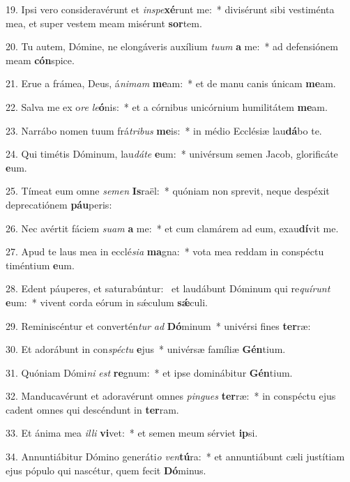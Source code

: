 19. Ipsi vero consideravérunt et \textit{in}\textit{spe}\textbf{xé}runt me:~*  divisérunt sibi vestiménta mea, et super vestem meam misérunt \textbf{sor}tem.\

20. Tu autem, Dómine, ne elongáveris auxílium \textit{tu}\textit{um} \textbf{a} me:~*  ad defensiónem meam \textbf{cón}spice.\

21. Erue a frámea, Deus, á\textit{ni}\textit{mam} \textbf{me}am:~*  et de manu canis únicam \textbf{me}am.\

22. Salva me ex o\textit{re} \textit{le}\textbf{ó}nis:~*  et a córnibus unicórnium humilitátem \textbf{me}am.\

23. Narrábo nomen tuum frá\textit{tri}\textit{bus} \textbf{me}is:~*  in médio Ecclésiæ lau\textbf{dá}bo te.\

24. Qui timétis Dóminum, lau\textit{dá}\textit{te} \textbf{e}um:~*  univérsum semen Jacob, glorificáte \textbf{e}um.\

25. Tímeat eum omne \textit{se}\textit{men} \textbf{Is}raël:~*  quóniam non sprevit, neque despéxit deprecatiónem \textbf{páu}peris:\

26. Nec avértit fáciem \textit{su}\textit{am} \textbf{a} me:~*  et cum clamárem ad eum, exau\textbf{dí}vit me.\

27. Apud te laus mea in ecclé\textit{si}\textit{a} \textbf{ma}gna:~*  vota mea reddam in conspéctu timéntium \textbf{e}um.\

28. Edent páuperes, et saturabúntur: \dag\  et laudábunt Dóminum qui re\textit{quí}\textit{runt} \textbf{e}um:~*  vivent corda eórum in sǽculum \textbf{sǽ}culi.\

29. Reminiscéntur et convertén\textit{tur} \textit{ad} \textbf{Dó}minum~*  univérsi fines \textbf{ter}ræ:\

30. Et adorábunt in con\textit{spéc}\textit{tu} \textbf{e}jus~*  univérsæ famíliæ \textbf{Gén}tium.\

31. Quóniam Dómi\textit{ni} \textit{est} \textbf{re}gnum:~*  et ipse dominábitur \textbf{Gén}tium.\

32. Manducavérunt et adoravérunt omnes \textit{pin}\textit{gues} \textbf{ter}ræ:~*  in conspéctu ejus cadent omnes qui descéndunt in \textbf{ter}ram.\

33. Et ánima mea \textit{il}\textit{li} \textbf{vi}vet:~*  et semen meum sérviet \textbf{ip}si.\

34. Annuntiábitur Dómino generáti\textit{o} \textit{ven}\textbf{tú}ra:~*  et annuntiábunt cæli justítiam ejus pópulo qui nascétur, quem fecit \textbf{Dó}minus.\

